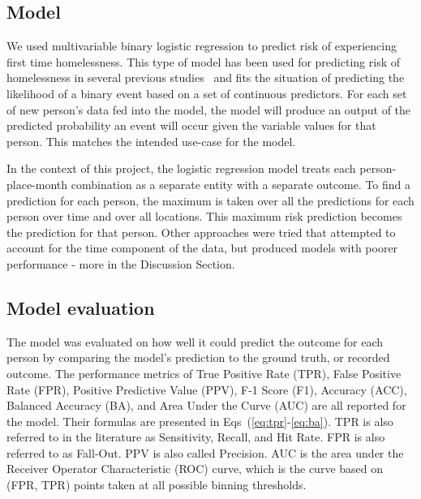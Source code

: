 \documentclass[10pt,letterpaper]{article}
\begin{document}
\subsection*{Model}
We used multivariable binary logistic regression to predict risk of experiencing first time homelessness. This type of model has been used for predicting risk of homelessness in several previous studies~\cite{byrne2020classification,van2009longitudinal,flaming2011crisis, hong2018applications,toros2019early} and fits the situation of predicting the likelihood of a binary event based on a set of continuous predictors. For each set of new person's data fed into the model, the model will produce an output of the predicted probability an event will occur given the variable values for that person. This matches the intended use-case for the model. 

In the context of this project, the logistic regression model treats each person-place-month combination as a separate entity with a separate outcome. To find a prediction for each person, the maximum is taken over all the predictions for each person over time and over all locations. This maximum risk prediction becomes the prediction for that person. Other approaches were tried that attempted to account for the time component of the data, but produced models with poorer performance - more in the Discussion Section.

\subsection*{Model evaluation}
The model was evaluated on how well it could predict the outcome for each person by comparing the model's prediction to the ground truth, or recorded outcome. The performance metrics of True Positive Rate (TPR), False Positive Rate (FPR), Positive Predictive Value (PPV), F-1 Score (F1), Accuracy (ACC), Balanced Accuracy (BA), and Area Under the Curve (AUC) are all reported for the model. Their formulas are presented in Eqs~(\ref{eq:tpr}-\ref{eq:ba}). TPR is also referred to in the literature as Sensitivity, Recall, and Hit Rate. FPR is also referred to as Fall-Out. PPV is also called Precision. AUC is the area under the Receiver Operator Characteristic (ROC) curve, which is the curve based on (FPR, TPR) points taken at all possible binning thresholds.
\end{document}
